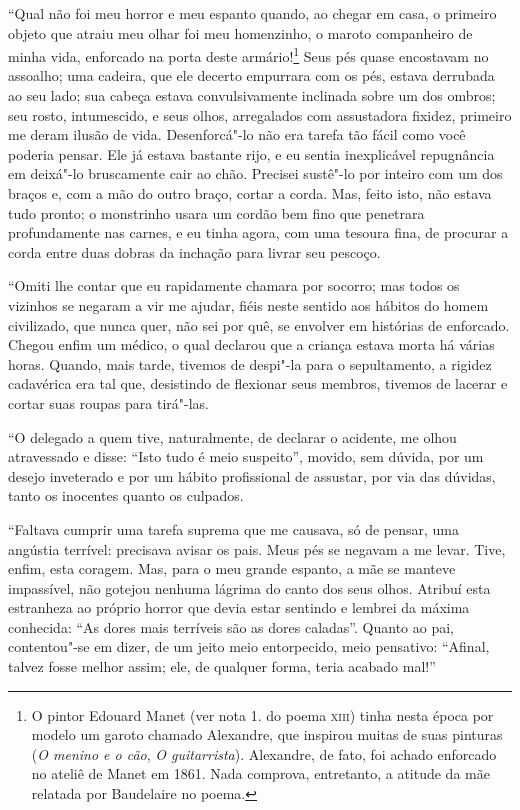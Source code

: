 “Qual não foi meu horror e meu espanto quando, ao chegar em
casa, o primeiro objeto que atraiu meu olhar foi meu homenzinho, o
maroto companheiro de minha vida, enforcado na porta deste
armário!\protect\footnote{  O pintor Edouard Manet (ver nota 1. do poema 
\textsc{xiii}) tinha nesta época
por modelo um garoto chamado Alexandre, que inspirou muitas de suas
pinturas (\textit{O menino e o cão}, \textit{O guitarrista}). Alexandre, de fato,
foi achado enforcado no ateliê de Manet em 1861. Nada comprova,
entretanto, a atitude da mãe relatada por Baudelaire no poema.} 
Seus pés quase encostavam no assoalho; uma
cadeira, que ele decerto empurrara com os pés, estava derrubada ao
seu lado; sua cabeça estava convulsivamente inclinada sobre um dos 
ombros; seu rosto, intumescido, e seus olhos, arregalados com 
assustadora fixidez, primeiro me deram ilusão de vida.
Desenforcá"-lo não era tarefa tão fácil como você poderia
pensar. Ele já estava bastante rijo, e eu sentia inexplicável repugnância
em deixá"-lo bruscamente cair ao chão. Precisei
sustê"-lo por inteiro com um dos braços e, com a mão do outro braço,
cortar a corda. Mas, feito isto, não estava tudo pronto; o monstrinho
usara um cordão bem fino que penetrara profundamente nas
carnes, e eu tinha agora, com uma tesoura fina, de procurar a corda 
entre duas dobras da inchação para livrar seu pescoço.

“Omiti lhe contar que eu rapidamente chamara por
socorro; mas todos os vizinhos se negaram a vir me ajudar,
fiéis neste sentido aos hábitos do homem civilizado, que nunca quer,
não sei por quê, se envolver em histórias de enforcado. Chegou enfim um
médico, o qual declarou que a criança estava morta há várias horas.
Quando, mais tarde, tivemos de despi"-la para o sepultamento, a
rigidez cadavérica era tal que, desistindo de flexionar seus membros,
tivemos de lacerar e cortar suas roupas para tirá"-las.

“O delegado a quem tive, naturalmente, de declarar o
acidente, me olhou atravessado e disse: ``Isto tudo é meio
suspeito'', movido, sem dúvida, por um desejo inveterado e
por um hábito profissional de assustar, por via das dúvidas, tanto os
inocentes quanto os culpados.

“Faltava cumprir uma tarefa suprema que me causava, só
de pensar, uma angústia terrível: precisava avisar os pais. Meus pés
se negavam a me levar. Tive, enfim, esta coragem. Mas, para o meu grande
espanto, a mãe se manteve impassível, não gotejou nenhuma lágrima do canto
dos seus olhos. Atribuí esta estranheza ao próprio horror que devia estar
sentindo e lembrei da máxima conhecida: ``As dores mais
terríveis são as dores caladas''. Quanto ao pai,
contentou"-se em dizer, de um jeito meio entorpecido, meio pensativo:
“Afinal, talvez fosse melhor assim; ele, de qualquer
forma, teria acabado mal!''


